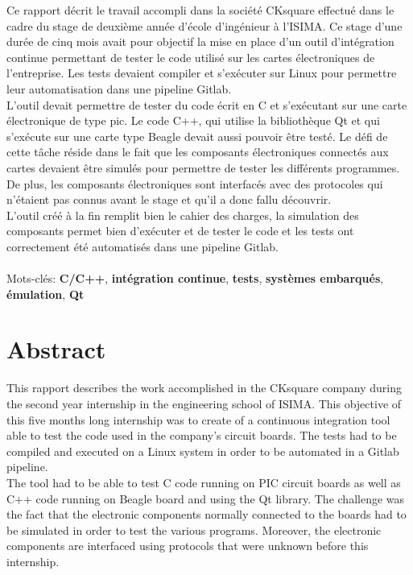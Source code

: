 \documentclass[a4paper]{article}
\begin{document}
Ce rapport décrit le travail accompli dans la société CKsquare effectué dans le
cadre du stage de deuxième année d'école d'ingénieur à l'ISIMA. Ce stage d'une
durée de cinq mois avait pour objectif la mise en place d'un outil d'intégration
continue permettant de tester le code utilisé sur les cartes électroniques de
l'entreprise. Les tests devaient compiler et s'exécuter sur Linux pour permettre
leur automatisation dans une pipeline Gitlab.\\

L'outil devait permettre de tester du code écrit en C et s'exécutant sur une
carte électronique de type \gls{pic}. Le code C++, qui utilise la bibliothèque
Qt et qui s'exécute sur une carte type Beagle devait aussi pouvoir être testé.
Le défi de cette tâche réside dans le fait que les composants électroniques
connectés aux cartes devaient être simulés pour permettre de tester les
différents programmes. De plus, les composants électroniques sont interfacés avec
des protocoles qui n'étaient pas connus avant le stage et qu'il a donc fallu
découvrir.\\

L'outil créé à la fin remplit bien le cahier des charges, la simulation des
composants permet bien d'exécuter et de tester le code et les tests ont
correctement été automatisés dans une pipeline Gitlab.
\\~\\

\noindent
Mots-clés: \textbf{C/C++}, \textbf{intégration continue}, \textbf{tests},
\textbf{systèmes embarqués}, \textbf{émulation}, \textbf{Qt}

\section*{Abstract}

This rapport describes the work accomplished in the CKsquare company during the
second year internship in the engineering school of ISIMA. This objective of
this five months long internship was to create of a continuous integration tool
able to test the code used in the company's circuit boards. The tests had to be
compiled and executed on a Linux system in order to be automated in a Gitlab
pipeline.\\

The tool had to be able to test C code running on PIC circuit boards as well as
C++ code running on Beagle board and using the Qt library. The challenge was the
fact that the electronic components normally connected to the boards had to be
simulated in order to test the various programs. Moreover, the electronic
components are interfaced using protocols that were unknown before this
internship.\\
\end{document}
